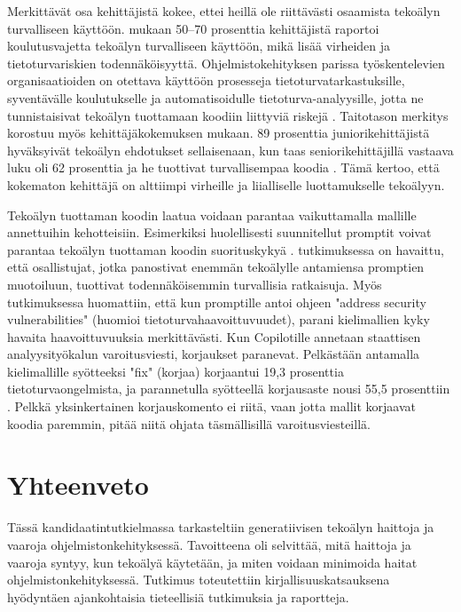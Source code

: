 \documentclass[utf8,bachelor]{gradu3}
\begin{document}
Merkittävät osa kehittäjistä kokee, ettei heillä ole riittävästi osaamista tekoälyn turvalliseen käyttöön. \textcite{staff_survey_2023} mukaan 50–70 prosenttia kehittäjistä raportoi koulutusvajetta tekoälyn turvalliseen käyttöön, mikä lisää virheiden ja tietoturvariskien todennäköisyyttä. Ohjelmistokehityksen parissa työskentelevien organisaatioiden on otettava käyttöön prosesseja tietoturvatarkastuksille, syventävälle koulutukselle ja automatisoidulle tietoturva-analyysille, jotta ne tunnistaisivat tekoälyn tuottamaan koodiin liittyviä riskejä \parencite{rahman_international_2024}. Taitotason merkitys korostuu myös kehittäjäkokemuksen mukaan. 89 prosenttia juniorikehittäjistä hyväksyivät tekoälyn ehdotukset sellaisenaan, kun taas seniorikehittäjillä vastaava luku oli  62 prosenttia ja he tuottivat turvallisempaa koodia \parencite{rahman_international_2024}. Tämä kertoo, että kokematon kehittäjä on alttiimpi virheille ja liialliselle luottamukselle tekoälyyn.

Tekoälyn tuottaman koodin laatua voidaan parantaa vaikuttamalla mallille annettuihin kehotteisiin. Esimerkiksi huolellisesti suunnitellut promptit voivat parantaa tekoälyn tuottaman koodin suorituskykyä \parencite{li_assessing_2024}. \textcite{perry_users_2023} tutkimuksessa on havaittu, että osallistujat, jotka panostivat enemmän tekoälylle antamiensa promptien muotoiluun, tuottivat todennäköisemmin turvallisia ratkaisuja. Myös \textcite{sajadi_llms_2025} tutkimuksessa huomattiin, että kun promptille antoi ohjeen "address security vulnerabilities" (huomioi tietoturvahaavoittuvuudet), parani kielimallien kyky havaita haavoittuvuuksia merkittävästi.  Kun Copilotille annetaan staattisen analyysityökalun varoitusviesti, korjaukset paranevat. Pelkästään antamalla kielimallille syötteeksi "fix" (korjaa) korjaantui 19,3 prosenttia tietoturvaongelmista, ja parannetulla syötteellä korjausaste nousi 55,5 prosenttiin \parencite{fu_security_2025}. Pelkkä yksinkertainen korjauskomento ei riitä, vaan jotta mallit korjaavat koodia paremmin, pitää niitä ohjata täsmällisillä varoitusviesteillä.

\chapter{Yhteenveto}

Tässä kandidaatintutkielmassa tarkasteltiin generatiivisen tekoälyn haittoja ja vaaroja ohjelmistonkehityksessä. Tavoitteena oli selvittää, mitä haittoja ja vaaroja syntyy, kun tekoälyä käytetään, ja miten voidaan minimoida haitat ohjelmistonkehityksessä. Tutkimus toteutettiin kirjallisuuskatsauksena hyödyntäen ajankohtaisia tieteellisiä tutkimuksia ja raportteja.
\end{document}
